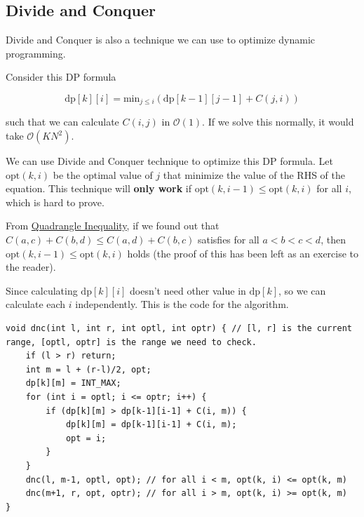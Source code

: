 \subsection{Divide and Conquer}

Divide and Conquer is also a technique we can use to optimize dynamic programming.

Consider this DP formula

\[ \text{dp}[k][i] = \text{min}_{j \le i}(\text{dp}[k-1][j-1] + C(j, i)) \]

such that we can calculate $C(i, j)$ in $\mathcal{O}(1)$. If we solve this normally, it would take $\mathcal{O}(KN^2)$.

We can use Divide and Conquer technique to optimize this DP formula. Let $\text{opt}(k, i)$ be the optimal value of $j$ that minimize the value of the RHS of the equation. This technique will \textbf{only work} if $\text{opt}(k, i-1) \le \text{opt}(k, i)$ for all $i$, which is hard to prove.

From \href{https://codeforces.com/blog/entry/86306}{Quadrangle Inequality}, if we found out that $C(a, c) + C(b, d) \le C(a, d) + C(b, c)$ satisfies for all $a < b < c < d$, then $\text{opt}(k, i-1) \le \text{opt}(k, i)$ holds (the proof of this has been left as an exercise to the reader).

Since calculating $\text{dp}[k][i]$ doesn't need other value in $\text{dp}[k]$, so we can calculate each $i$ independently. This is the code for the algorithm.

\begin{lstlisting}
void dnc(int l, int r, int optl, int optr) { // [l, r] is the current range, [optl, optr] is the range we need to check.
    if (l > r) return;
    int m = l + (r-l)/2, opt;
    dp[k][m] = INT_MAX;
    for (int i = optl; i <= optr; i++) {
        if (dp[k][m] > dp[k-1][i-1] + C(i, m)) {
            dp[k][m] = dp[k-1][i-1] + C(i, m);
            opt = i;
        }
    }
    dnc(l, m-1, optl, opt); // for all i < m, opt(k, i) <= opt(k, m)
    dnc(m+1, r, opt, optr); // for all i > m, opt(k, i) >= opt(k, m)
}
\end{lstlisting}

\break